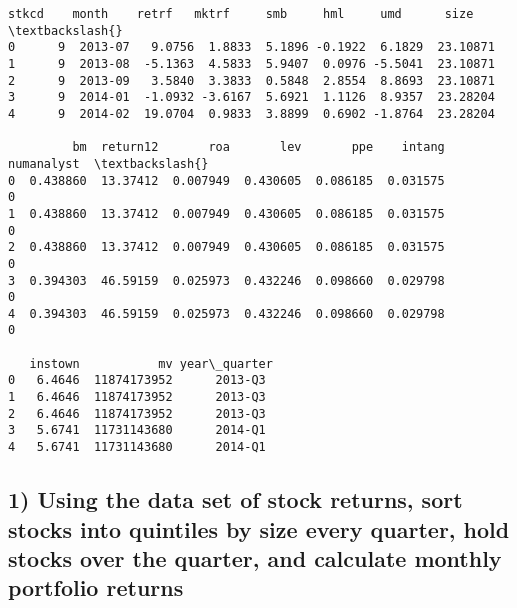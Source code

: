 \documentclass[11pt]{article}
\makeatletter
\newcommand{\boxspacing}{\kern\kvtcb@left@rule\kern\kvtcb@boxsep}
\newcommand{\prompt}[4]{
        {\ttfamily\llap{{\color{#2}[#3]:\hspace{3pt}#4}}\vspace{-\baselineskip}}
    }
\makeatother
\begin{document}
            \begin{tcolorbox}[breakable, size=fbox, boxrule=.5pt, pad at break*=1mm, opacityfill=0]
\prompt{Out}{outcolor}{3}{\boxspacing}
\begin{Verbatim}[commandchars=\\\{\}]
   stkcd    month    retrf   mktrf     smb     hml     umd      size  \textbackslash{}
0      9  2013-07   9.0756  1.8833  5.1896 -0.1922  6.1829  23.10871
1      9  2013-08  -5.1363  4.5833  5.9407  0.0976 -5.5041  23.10871
2      9  2013-09   3.5840  3.3833  0.5848  2.8554  8.8693  23.10871
3      9  2014-01  -1.0932 -3.6167  5.6921  1.1126  8.9357  23.28204
4      9  2014-02  19.0704  0.9833  3.8899  0.6902 -1.8764  23.28204

         bm  return12       roa       lev       ppe    intang  numanalyst  \textbackslash{}
0  0.438860  13.37412  0.007949  0.430605  0.086185  0.031575           0
1  0.438860  13.37412  0.007949  0.430605  0.086185  0.031575           0
2  0.438860  13.37412  0.007949  0.430605  0.086185  0.031575           0
3  0.394303  46.59159  0.025973  0.432246  0.098660  0.029798           0
4  0.394303  46.59159  0.025973  0.432246  0.098660  0.029798           0

   instown           mv year\_quarter
0   6.4646  11874173952      2013-Q3
1   6.4646  11874173952      2013-Q3
2   6.4646  11874173952      2013-Q3
3   5.6741  11731143680      2014-Q1
4   5.6741  11731143680      2014-Q1
\end{Verbatim}
\end{tcolorbox}
        
    \hypertarget{using-the-data-set-of-stock-returns-sort-stocks-into-quintiles-by-size-every-quarter-hold-stocks-over-the-quarter-and-calculate-monthly-portfolio-returns}{%
\subsection{1) Using the data set of stock returns, sort stocks into
quintiles by size every quarter, hold stocks over the quarter, and
calculate monthly portfolio
returns}\label{using-the-data-set-of-stock-returns-sort-stocks-into-quintiles-by-size-every-quarter-hold-stocks-over-the-quarter-and-calculate-monthly-portfolio-returns}}
\end{document}
